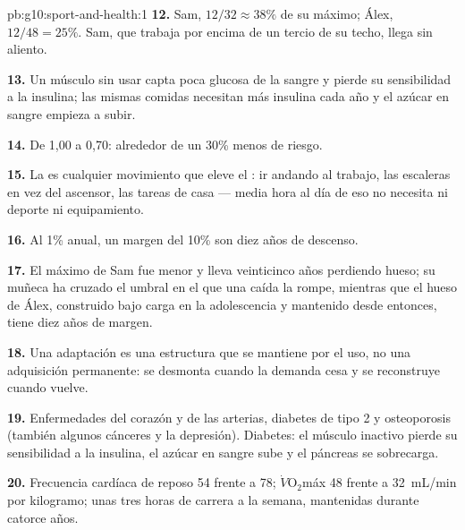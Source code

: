 \begin{solution}{pb:g10:sport-and-health:1}
\textbf{12.} Sam, $12/32 \approx 38\%$ de su máximo; Álex, $12/48 =
25\%$. Sam, que trabaja por encima de un tercio de su techo, llega sin
aliento.

\textbf{13.} Un músculo sin usar capta poca glucosa de la sangre y
pierde su sensibilidad a la insulina; las mismas comidas necesitan más
insulina cada año y el azúcar en sangre empieza a subir.

\textbf{14.} De 1,00 a 0,70: alrededor de un 30\% menos de riesgo.

\textbf{15.} La  es cualquier movimiento que eleve el
: ir andando al trabajo, las escaleras en vez del
ascensor, las tareas de casa --- media hora al día de eso no necesita
ni deporte ni equipamiento.

\textbf{16.} Al 1\% anual, un margen del 10\% son diez años de
descenso.

\textbf{17.} El máximo de Sam fue menor y lleva veinticinco años
perdiendo hueso; su muñeca ha cruzado el umbral en el que una caída la
rompe, mientras que el hueso de Álex, construido bajo carga en la
adolescencia y mantenido desde entonces, tiene diez años de margen.

\textbf{18.} Una adaptación es una estructura que se mantiene por el
uso, no una adquisición permanente: se desmonta cuando la demanda cesa
y se reconstruye cuando vuelve.

\textbf{19.} Enfermedades del corazón y de las arterias, diabetes de
tipo 2 y osteoporosis (también algunos cánceres y la depresión).
Diabetes: el músculo inactivo pierde su sensibilidad a la insulina, el
azúcar en sangre sube y el páncreas se sobrecarga.

\textbf{20.} Frecuencia cardíaca de reposo 54 frente a 78;
$\dot V\!\mathrm{O_2}$máx \num{48} frente a \qty{32}{mL/min} por
kilogramo; unas tres horas de carrera a la semana, mantenidas durante
catorce años.
\end{solution}
